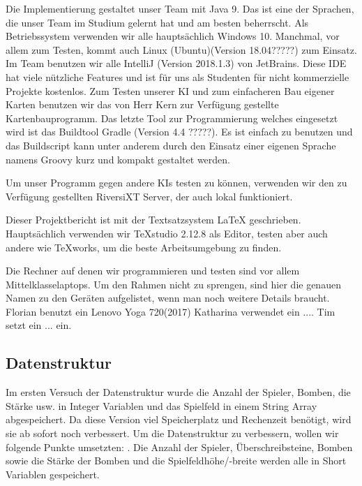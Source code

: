 \documentclass[12pt,a4paper,bibliography=totocnumbered,listof=totocnumbered]{scrartcl}
\begin{document}
Die Implementierung gestaltet unser Team mit Java 9. Das ist eine der Sprachen, die unser Team im Studium gelernt hat und am besten beherrscht. Als Betriebssystem verwenden wir alle hauptsächlich Windows 10. Manchmal, vor allem zum Testen, kommt auch Linux (Ubuntu)(Version 18.04?????) zum Einsatz. Im Team benutzen wir alle IntelliJ (Version 2018.1.3) von JetBrains. Diese IDE hat viele nützliche Features und ist für uns als Studenten für nicht kommerzielle Projekte kostenlos. Zum Testen unserer KI und zum einfacheren Bau eigener Karten benutzen wir das von Herr Kern zur Verfügung gestellte Kartenbauprogramm.
 Das letzte Tool zur Programmierung welches eingesetzt wird ist das Buildtool Gradle (Version 4.4 ?????). Es ist einfach zu benutzen und das Buildscript kann unter anderem durch den Einsatz einer eigenen Sprache namens Groovy kurz und kompakt gestaltet werden.

Um unser Programm gegen andere KIs testen zu können, verwenden wir den zu Verfügung gestellten RiversiXT Server, der auch lokal funktioniert.

Dieser Projektbericht ist mit der Textsatzsystem LaTeX geschrieben. Hauptsächlich verwenden wir TeXstudio 2.12.8 als Editor, testen aber auch andere wie TeXworks, um die beste Arbeitsumgebung zu finden.

Die Rechner auf denen wir programmieren und testen sind vor allem \glqq Mittelklasselaptops\grqq. Um den Rahmen nicht zu sprengen, sind hier die genauen Namen zu den Geräten aufgelistet, wenn man noch weitere Details braucht. Florian benutzt ein Lenovo Yoga 720(2017) %
Katharina verwendet ein ....%
Tim setzt ein ... ein.%

\subsection{Datenstruktur}
Im ersten Versuch der Datenstruktur wurde die Anzahl der Spieler, Bomben, die Stärke usw. in Integer Variablen und das Spielfeld in einem String Array abgespeichert. Da diese Version viel Speicherplatz und Rechenzeit benötigt, wird sie ab sofort noch verbessert.
Um die Datenstruktur zu verbessern, wollen wir folgende Punkte umsetzten:
. Die Anzahl der Spieler, Überschreibsteine, Bomben sowie die Stärke der Bomben und die Spielfeldhöhe/-breite werden alle in Short Variablen gespeichert. 
\end{document}
